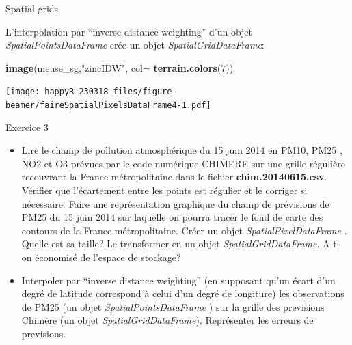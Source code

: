 \documentclass[8pt,ignorenonframetext,]{beamer}
\newenvironment{Shaded}{\begin{snugshade}}{\end{snugshade}}
\newcommand{\KeywordTok}[1]{\textcolor[rgb]{0.13,0.29,0.53}{\textbf{{#1}}}}
\newcommand{\DataTypeTok}[1]{\textcolor[rgb]{0.13,0.29,0.53}{{#1}}}
\newcommand{\DecValTok}[1]{\textcolor[rgb]{0.00,0.00,0.81}{{#1}}}
\newcommand{\StringTok}[1]{\textcolor[rgb]{0.31,0.60,0.02}{{#1}}}
\newcommand{\NormalTok}[1]{{#1}}
\begin{document}
\begin{frame}[fragile]{Spatial grids}

L'interpolation par ``inverse distance weighting'' d'un objet
\emph{SpatialPointsDataFrame} crée un objet \emph{SpatialGridDataFrame}:

\begin{Shaded}
\begin{Highlighting}[]
    \KeywordTok{image}\NormalTok{(meuse_sg,}\StringTok{"zincIDW"}\NormalTok{, }\DataTypeTok{col=} \KeywordTok{terrain.colors}\NormalTok{(}\DecValTok{7}\NormalTok{))}
\end{Highlighting}
\end{Shaded}

\texttt{[image: happyR-230318\_files/figure-beamer/faireSpatialPixelsDataFrame4-1.pdf]}

\end{frame}

\begin{frame}{Exercice 3}

\begin{itemize}
\item
  Lire le champ de pollution atmosphérique du 15 juin 2014 en PM10, PM25
  , NO2 et O3 prévues par le code numérique CHIMERE sur une grille
  régulière recouvrant la France métropolitaine dans le fichier
  \textbf{chim.20140615.csv}. Vérifier que l'écartement entre les points
  est régulier et le corriger si nécessaire. Faire une représentation
  graphique du champ de prévisions de PM25 du 15 juin 2014 sur laquelle
  on pourra tracer le fond de carte des contours de la France
  métropolitaine. Créer un objet \emph{SpatialPixelDataFrame} . Quelle
  est sa taille? Le transformer en un objet \emph{SpatialGridDataFrame}.
  A-t-on économisé de l'espace de stockage?
\item
  Interpoler par ``inverse distance weighting'' (en supposant qu'un
  écart d'un degré de latitude correspond à celui d'un degré de
  longiture) les observations de PM25 (un objet
  \emph{SpatialPointsDataFrame} ) sur la grille des previsions Chimère
  (un objet \emph{SpatialGridDataFrame}). Représenter les erreurs de
  previsions.
\end{itemize}

\end{frame}
\end{document}
